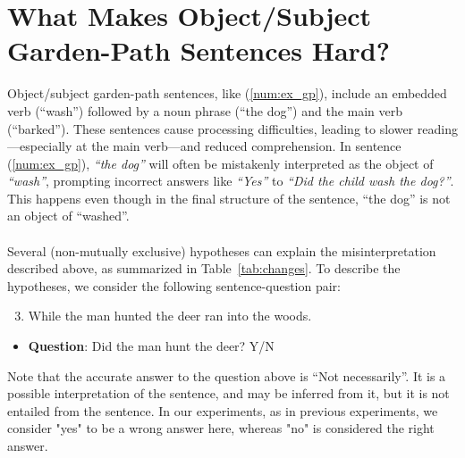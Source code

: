 \section{What Makes Object/Subject Garden-Path Sentences Hard?}

Object/subject garden-path sentences, like (\ref{num:ex_gp}), include an embedded verb (``wash'') followed by a noun phrase (``the dog'') and the main verb (``barked''). These sentences cause processing difficulties, leading to slower reading—especially at the main verb—and reduced comprehension. In sentence (\ref{num:ex_gp}), \emph{``the dog''} will often be mistakenly interpreted as the object of \emph{``wash''}, prompting incorrect answers like \emph{``Yes''} to \emph{``Did the child wash the dog?''}. This happens even though in the final structure of the sentence, ``the dog'' is not an object of ``washed''. 


\paragraph{}
Several (non-mutually exclusive) hypotheses can explain the misinterpretation described above, as summarized in Table~\ref{tab:changes}.
To describe the hypotheses, we consider the following sentence-question pair:
\begin{enumerate}[nosep,leftmargin=*]
    \setcounter{enumi}{2}
    \item \label{num:ex_gp_3} While the man hunted the deer ran into the woods.
\end{enumerate}
\begin{itemize}[nosep,leftmargin=*]
    \item[] \textbf{Question}: Did the man hunt the deer?   Y/N
\end{itemize}

Note that the accurate answer to the question above is ``Not necessarily''. It is a possible interpretation of the sentence, and may be inferred from it, but it is not entailed from the sentence. In our experiments, as in previous experiments, we consider "yes" to be a wrong answer here, whereas "no" is considered the right answer.  

